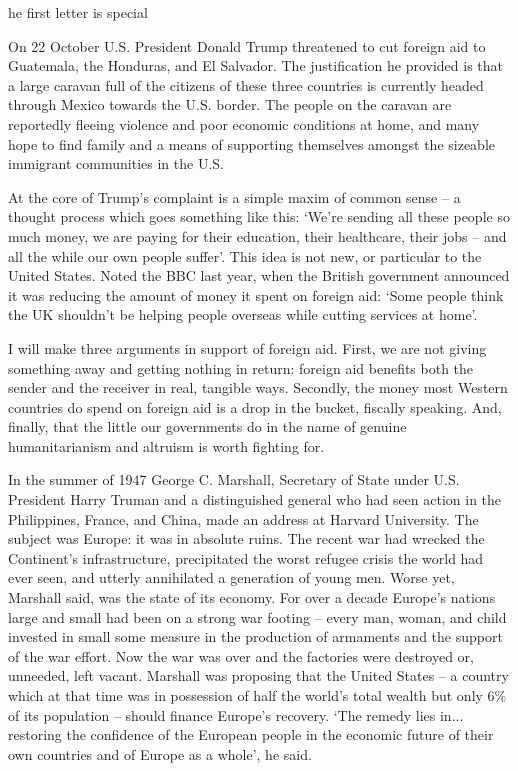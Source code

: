 \label{ch:in-defence-of-giving-foreigners-our-tax-money}

he first letter is special


   On 22 October U.S. President Donald Trump threatened to cut foreign aid
   to Guatemala, the Honduras, and El Salvador. The justification he
   provided is that a large caravan full of the citizens of these three
   countries is currently headed through Mexico towards the U.S. border.
   The people on the caravan are reportedly fleeing violence and poor
   economic conditions at home, and many hope to find family and a means
   of supporting themselves amongst the sizeable immigrant communities in
   the U.S.

   At the core of Trump's complaint is a simple maxim of common sense -- a
   thought process which goes something like this: `We're sending all
   these people so much money, we are paying for their education, their
   healthcare, their jobs -- and all the while our own people suffer'.
   This idea is not new, or particular to the United States. Noted the BBC
   last year, when the British government announced it was reducing the
   amount of money it spent on foreign aid: `Some people think the UK
   shouldn't be helping people overseas while cutting services at home'.

   I will make three arguments in support of foreign aid. First, we are
   not giving something away and getting nothing in return: foreign aid
   benefits both the sender and the receiver in real, tangible ways.
   Secondly, the money most Western countries do spend on foreign aid is a
   drop in the bucket, fiscally speaking. And, finally, that the little
   our governments do in the name of genuine humanitarianism and altruism
   is worth fighting for.

   In the summer of 1947 George C. Marshall, Secretary of State under U.S.
   President Harry Truman and a distinguished general who had seen action
   in the Philippines, France, and China, made an address at Harvard
   University. The subject was Europe: it was in absolute ruins. The
   recent war had wrecked the Continent's infrastructure, precipitated the
   worst refugee crisis the world had ever seen, and utterly annihilated a
   generation of young men. Worse yet, Marshall said, was the state of its
   economy. For over a decade Europe's nations large and small had been on
   a strong war footing -- every man, woman, and child invested in small
   some measure in the production of armaments and the support of the war
   effort. Now the war was over and the factories were destroyed or,
   unneeded, left vacant. Marshall was proposing that the United States --
   a country which at that time was in possession of half the world's
   total wealth but only 6\% of its population -- should finance Europe's
   recovery. `The remedy lies in... restoring the confidence of the
   European people in the economic future of their own countries and of
   Europe as a whole', he said.

